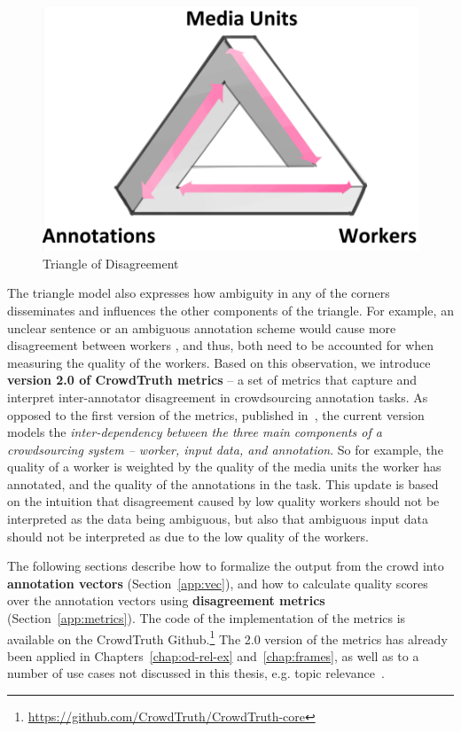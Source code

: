  \begin{figure}[!bth]
 	\centering
 		\includegraphics[width=0.5\linewidth]{img/triangle.png}
 	\caption{Triangle of Disagreement}
 	\label{fig:tor}
 \end{figure}


The triangle model also expresses how ambiguity in any of the corners disseminates and influences the other components of the triangle. For example, an unclear sentence or an ambiguous annotation scheme would cause more disagreement between workers \cite{aroyo2014threesides}, and thus, both need to be accounted for when measuring the quality of the workers. Based on this observation, we introduce \textbf{version 2.0 of CrowdTruth metrics} -- a set of metrics that capture and interpret inter-annotator disagreement in crowdsourcing annotation tasks. As opposed to the first version of the metrics, published in~\cite{inel2014crowdtruth}, the current version models the \textit{inter-dependency between the three main components of a crowdsourcing system -- worker, input data, and annotation}. So for example, the quality of a worker is weighted by the quality of the media units the worker has annotated, and the quality of the annotations in the task. This update is based on the intuition that disagreement caused by low quality workers should not be interpreted as the data being ambiguous, but also that ambiguous input data should not be interpreted as due to the low quality of the workers.

The following sections describe how to formalize the output from the crowd into \textbf{annotation vectors} (Section~\ref{app:vec}), and how to calculate quality scores over the annotation vectors using \textbf{disagreement metrics} (Section~\ref{app:metrics}). The code of the implementation of the metrics is available on the CrowdTruth Github.\footnote{\url{https://github.com/CrowdTruth/CrowdTruth-core}} The 2.0 version of the metrics has already been applied in Chapters~\ref{chap:od-rel-ex} and~\ref{chap:frames}, as well as to a number of use cases not discussed in this thesis, e.g. topic relevance~\cite{inel2018studying}.


